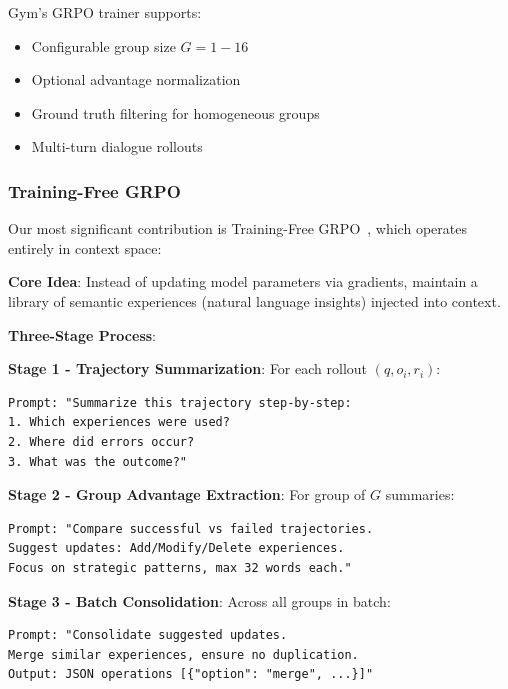 Gym's GRPO trainer supports:
\begin{itemize}
\item Configurable group size $G = 1-16$
\item Optional advantage normalization
\item Ground truth filtering for homogeneous groups
\item Multi-turn dialogue rollouts
\end{itemize}

\subsubsection{Training-Free GRPO}

Our most significant contribution is Training-Free GRPO~\citep{tencent2025trainingfree}, which operates entirely in context space:

\textbf{Core Idea}: Instead of updating model parameters via gradients, maintain a library of semantic experiences (natural language insights) injected into context.

\textbf{Three-Stage Process}:

\textbf{Stage 1 - Trajectory Summarization}: For each rollout $(q, o_i, r_i)$:
\begin{verbatim}
Prompt: "Summarize this trajectory step-by-step:
1. Which experiences were used?
2. Where did errors occur?
3. What was the outcome?"
\end{verbatim}

\textbf{Stage 2 - Group Advantage Extraction}: For group of $G$ summaries:
\begin{verbatim}
Prompt: "Compare successful vs failed trajectories.
Suggest updates: Add/Modify/Delete experiences.
Focus on strategic patterns, max 32 words each."
\end{verbatim}

\textbf{Stage 3 - Batch Consolidation}: Across all groups in batch:
\begin{verbatim}
Prompt: "Consolidate suggested updates.
Merge similar experiences, ensure no duplication.
Output: JSON operations [{"option": "merge", ...}]"
\end{verbatim}

